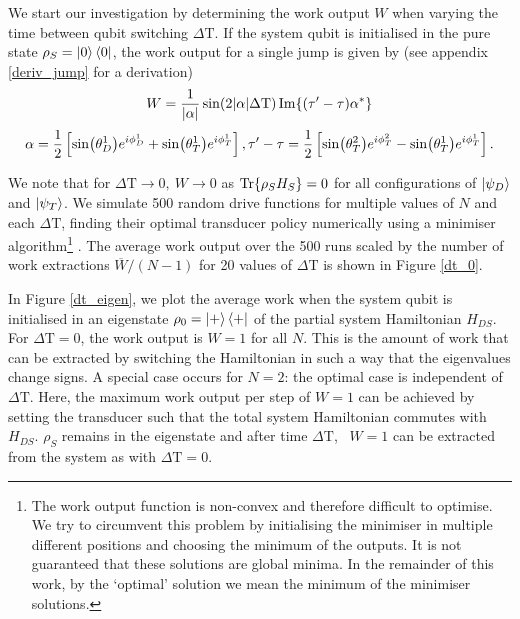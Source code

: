 We start our investigation by determining the work output $W$ when varying the time between qubit switching $\Delta \mathrm{T}$.
If the system qubit is initialised in the pure state $\rho_S = \ket{0} \bra{0}$, the work output for a single jump is given by (see appendix \ref{deriv_jump} for a derivation)
\begin{equation} \label{single_work}
	W = \frac{1}{\abs{\alpha}} \sin(2\abs{\alpha}\Delta \mathrm{T}) \Im{(\tau' - \tau) \alpha^*}
\end{equation}
\begin{equation*}
	\alpha = \frac{1}{2} \left[\sin(\theta_D^1) e^{i\phi_D^1} + \sin(\theta_T^1) e^{i\phi_T^1}\right], \\
	\tau' - \tau = \frac{1}{2} \left[ \sin(\theta_T^2)e^{i\phi_T^2} - \sin(\theta_T^1)e^{i\phi_T^1} \right].
\end{equation*}

We note that for $\Delta \mathrm{T} \to 0, \ W \to 0$ as $\Tr{\rho_S H_S} = 0$ for all configurations of $\ket{\psi_D}$ and $ \ket{\psi_T}$.
We simulate 500 random drive functions for multiple values of $N$ and each $\Delta \mathrm{T}$, finding their optimal transducer policy numerically using a minimiser algorithm\footnote{The work output function is non-convex and therefore difficult to optimise. We try to circumvent this problem by initialising the minimiser in multiple different positions and choosing the minimum of the outputs. It is not guaranteed that these solutions are global minima. In the remainder of this work, by the `optimal' solution we mean the minimum of the minimiser solutions.} \cite{2020SciPy-NMeth}. The average work output over the 500 runs scaled by the number of work extractions $\overline{W}/(N-1)$ for 20 values of $\Delta \mathrm{T}$ is shown in Figure \ref{dt_0}.

In Figure \ref{dt_eigen}, we plot the average work when the system qubit is initialised in an eigenstate $\rho_0 = \ket{+}\bra{+}$ of the partial system Hamiltonian $H_{DS}$.
For $\Delta \mathrm{T} = 0$, the work output is $W = 1$ for all $N$. This is the amount of work that can be extracted by switching the Hamiltonian in such a way that the eigenvalues change signs.
A special case occurs for $N = 2$: the optimal case is independent of $\Delta \mathrm{T}$.
Here, the maximum work output per step of $W = 1$ can be achieved by setting the transducer such that the total system Hamiltonian commutes with $H_{DS}$. $\rho_S$ remains in the eigenstate and after time $\Delta \mathrm{T}$, \ $W = 1$ can be extracted from the system as with $\Delta \mathrm{T} = 0$.

